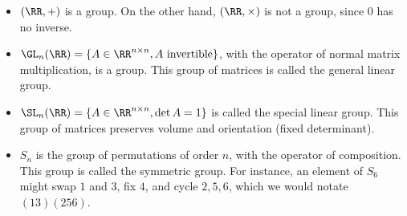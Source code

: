 \begin{itemize}
    \item $(\RR, +)$ is a group. On the other hand, $(\RR, \times)$ is not a group, since $0$ has no inverse.
    \item $\GL_n(\RR) = \{A\in \RR^{n\times n}, A\text{ invertible}\}$, with the operator of normal matrix multiplication, is a group. This group of matrices is called the \ac{general linear group}. 
    \item $\SL_n(\RR) = \{A\in \RR^{n\times n}, \det A = 1\}$ is called the \ac{special linear group}. This group of matrices preserves volume and orientation (fixed determinant). 
    \item $S_n$ is the group of permutations of order $n$, with the operator of composition. This group is called the \ac{symmetric group}. For instance, an element of $S_6$ might swap $1$ and $3$, fix $4$, and cycle $2,5,6$, which we would notate $(1 3)(2 5 6)$. 
\end{itemize}